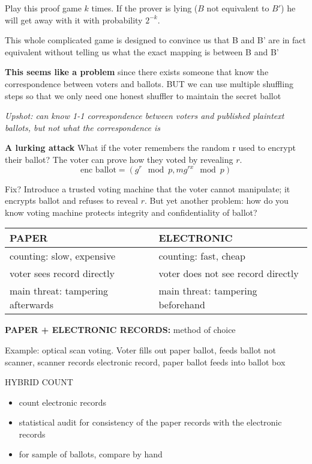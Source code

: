 Play this proof game $k$ times. If the prover is lying ($B$ not equivalent to $B'$) he will get away with it with probability $2^{-k}$.

This whole complicated game is designed to convince us that B and B' are in fact equivalent without telling us what the exact mapping is between B and B'

\textbf{This seems like a problem} since there exists someone that know the correspondence between voters and ballots. BUT we can use multiple shuffling steps so that we only need one honest shuffler to maintain the secret ballot 

\textit{Upshot: can know 1-1 correspondence between voters and published plaintext ballots, but not what the correspondence is}

\textbf{A lurking attack}
What if the voter remembers the random r used to encrypt their ballot? The voter can prove how they voted by revealing $r$.
		$$\text{enc ballot} = (g^r \mod p, m g^{rx} \mod p)$$

Fix? Introduce a trusted voting machine that the voter cannot manipulate; it encrypts ballot and refuses to reveal $r$. But yet another problem: how do you know voting machine protects integrity and confidentiality of ballot? 

\begin{tabular}{|l|l|}
\hline
PAPER & ELECTRONIC\\
\hline
counting: slow, expensive & counting: fast, cheap\\
voter sees record directly & voter does not see record directly\\
main threat: tampering afterwards & main threat: tampering beforehand\\
\hline
\end{tabular}


\textbf{PAPER + ELECTRONIC RECORDS:} method of choice

Example: optical scan voting. Voter fills out paper ballot, feeds ballot not scanner, scanner records electronic record, paper ballot feeds into ballot box

HYBRID COUNT
\begin{itemize}
	\item count electronic records
	\item statistical audit for consistency of the paper records with the electronic records 
	\item for sample of ballots, compare by hand
\end{itemize}




